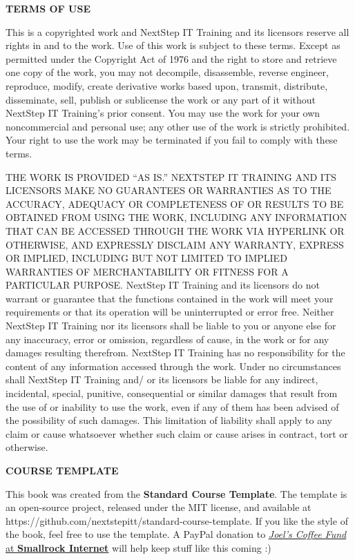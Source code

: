 \documentclass[../workbook]{subfiles}
\begin{document}
{    \par{
        \textbf{TERMS OF USE}
    }

    \par{
        This is a copyrighted work and NextStep IT Training and its licensors reserve all rights in and to the work.
        Use of this work is subject to these terms.
        Except as permitted under the Copyright Act of 1976 and the right to store and retrieve one copy of the work, you may not decompile, disassemble, reverse engineer, reproduce, modify, create derivative works based upon, transmit, distribute, disseminate, sell, publish or sublicense the work or any part of it without NextStep IT Training's prior consent.
        You may use the work for your own noncommercial and personal use; any other use of the work is strictly prohibited.
        Your right to use the work may be terminated if you fail to comply with these terms.
    }

    \par{
        THE WORK IS PROVIDED “AS IS.”
        NEXTSTEP IT TRAINING AND ITS LICENSORS MAKE NO GUARANTEES OR WARRANTIES AS TO THE ACCURACY, ADEQUACY OR COMPLETENESS OF OR RESULTS TO BE OBTAINED FROM USING THE WORK, INCLUDING ANY INFORMATION THAT CAN BE ACCESSED THROUGH THE WORK VIA HYPERLINK OR OTHERWISE, AND EXPRESSLY DISCLAIM ANY WARRANTY, EXPRESS OR IMPLIED, INCLUDING BUT NOT LIMITED TO IMPLIED WARRANTIES OF MERCHANTABILITY OR FITNESS FOR A PARTICULAR PURPOSE.
        NextStep IT Training and its licensors do not warrant or guarantee that the functions contained in the work will meet your requirements or that its operation will be uninterrupted or error free. Neither NextStep IT Training nor its licensors shall be liable to you or anyone else for any inaccuracy, error or omission, regardless of cause, in the work or for any damages resulting therefrom.
        NextStep IT Training has no responsibility for the content of any information accessed through the work. Under no circumstances shall NextStep IT Training and/ or its licensors be liable for any indirect, incidental, special, punitive, consequential or similar damages that result from the use of or inability to use the work, even if any of them has been advised of the possibility of such damages.
        This limitation of liability shall apply to any claim or cause whatsoever whether such claim or cause arises in contract, tort or otherwise.
    }

    \par{
        \textbf{COURSE TEMPLATE}
    }

    \par{
        This book was created from the \textbf{Standard Course Template}.
        The template is an open-source project, released under the MIT license, and available at https://github.com/nextstepitt/standard-course-template. 
        If you like the style of the book, feel free to use the template.
        A PayPal donation to \href{https://www.paypal.com/cgi-bin/webscr?cmd=_s-xclick&hosted_button_id=XPUGVGZZ8RUAA}{\textit{Joel's Coffee Fund} at \textbf{Smallrock Internet}} will help keep stuff like this coming :)
    }
}
\end{document}
